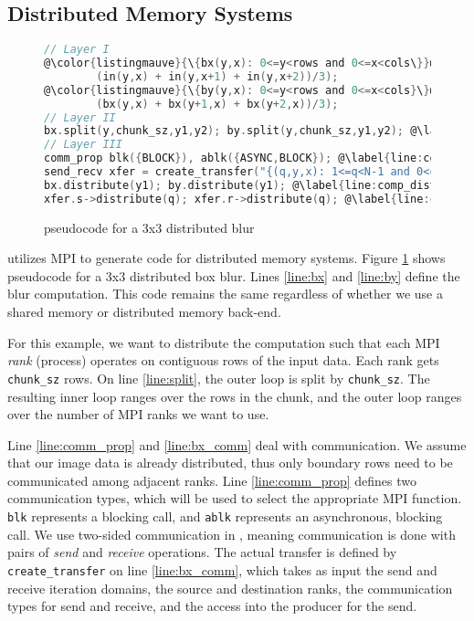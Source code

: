 \subsection{Distributed Memory Systems}
\begin{figure}
\begin{lstlisting}[language=C,escapechar=@]
// Layer I
@\color{listingmauve}{\{bx(y,x): 0<=y<rows and 0<=x<cols\}}@ : @\label{line:bx}@
        (in(y,x) + in(y,x+1) + in(y,x+2))/3);
@\color{listingmauve}{\{by(y,x): 0<=y<rows and 0<=x<cols}\}@ : @\label{line:by}@
        (bx(y,x) + bx(y+1,x) + bx(y+2,x))/3);
// Layer II
bx.split(y,chunk_sz,y1,y2); by.split(y,chunk_sz,y1,y2); @\label{line:split}@
// Layer III
comm_prop blk({BLOCK}), ablk({ASYNC,BLOCK}); @\label{line:comm_prop}@
send_recv xfer = create_transfer("{(q,y,x): 1<=q<N-1 and 0<=y<2 and 0<=x<cols}","{(q,y,x): 0<=q<N-2 and 0<=y<2 and     0<=x<cols}",q-1,q,ablk,blk,bx(y,x)); @\label{line:bx_comm}@
bx.distribute(y1); by.distribute(y1); @\label{line:comp_dist}@
xfer.s->distribute(q); xfer.r->distribute(q); @\label{line:comm_dist}@
\end{lstlisting}
\caption{\framework{} pseudocode for a 3x3 distributed blur}
\label{code:blurxy_dist}
\vspace{-0.25cm}
\end{figure}
\framework{} utilizes MPI to generate code for distributed memory systems. Figure \ref{code:blurxy_dist} shows \framework{} pseudocode for a 3x3 distributed box blur. Lines \ref{line:bx} and \ref{line:by} define the blur computation. This code remains the same regardless of whether we use a shared memory or distributed memory back-end. 

For this example, we want to distribute the computation such that each MPI \emph{rank} (process) operates on contiguous rows of the input data. Each rank gets \lstinline{chunk_sz} rows. On line \ref{line:split}, the outer loop is split by \lstinline{chunk_sz}. The resulting inner loop ranges over the rows in the chunk, and the outer loop ranges over the number of MPI ranks we want to use.

Line \ref{line:comm_prop} and \ref{line:bx_comm} deal with communication. We assume that our image data is already distributed, thus only boundary rows need to be communicated among adjacent ranks. Line \ref{line:comm_prop} defines two communication types, which will be used to select the appropriate MPI function. \lstinline{blk} represents a blocking call, and \lstinline{ablk} represents an asynchronous, blocking call. We use two-sided communication in \framework{}, meaning communication is done with pairs of \emph{send} and \emph{receive} operations. The actual transfer is defined by \lstinline{create_transfer} on line \ref{line:bx_comm}, which takes as input the send and receive iteration domains, the source and destination ranks, the communication types for send and receive, and the access into the producer for the send.

